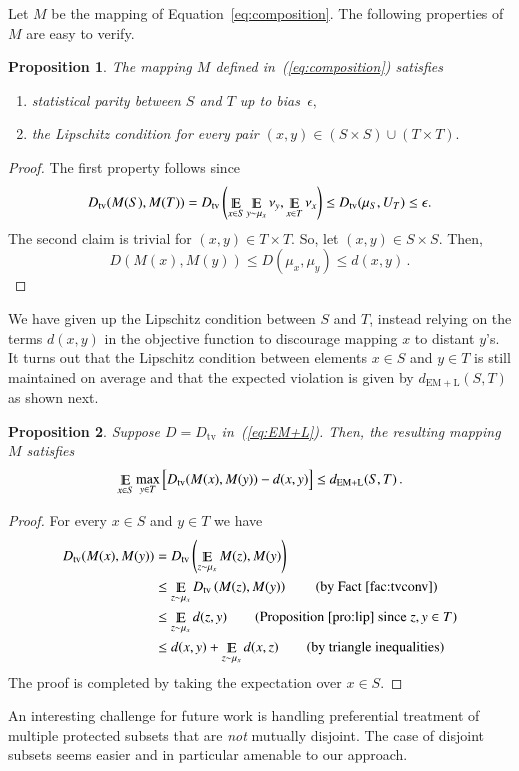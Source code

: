 \documentclass[letterpaper,11pt]{article}
\newtheorem{proposition}{Proposition}[section]
\theoremstyle{definition}
\renewcommand{\mathbb}{\varmathbb}
\newcommand{\Esymb}{\mathbb{E}}
\DeclareMathOperator*{\E}{\Esymb}
\newcommand{\mper}{\,.}
\newcommand{\tv}{\mathrm{tv}}
\newcommand\EM{\mathrm{EM}}
\begin{document}
\noindent
Let $M$ be the mapping of Equation~\ref{eq:composition}.  The
following properties of~$M$ are easy to verify.
\begin{proposition}\label{pro:lip}
The mapping $M$ defined in~(\ref{eq:composition})
satisfies
\begin{enumerate}
\item statistical parity between $S$ and $T$ up to bias~$\epsilon,$
\item the Lipschitz condition for every pair $(x,y)\in (S\times
S)\cup(T\times T).$
\end{enumerate}
\end{proposition}
\begin{proof}
The first property follows since
\[
D_\tv(M(S),M(T))=D_\tv\left(\E_{x\in S}\E_{y\sim\mu_x}\nu_y,\E_{x\in
T}\nu_x\right)
\le D_\tv(\mu_S,U_T)\le\epsilon.
\]
The second claim is trivial for $(x,y)\in T\times T.$ So, let $(x,y)\in S\times
S.$ Then,
\[
D(M(x),M(y))
\le D(\mu_x,\mu_y)
\le d(x,y)\mper
\]
\end{proof}

We have given up the Lipschitz condition between $S$ and $T$, instead
relying on the terms $d(x,y)$ in the objective function to
discourage mapping $x$ to distant $y$'s. It turns out that the Lipschitz
condition between elements $x\in S$ and $y\in T$ is still maintained on
average and that the expected violation is given by $d_{\EM+\mathrm{L}}(S,T)$
as shown next.
%
\begin{proposition}
Suppose $D=D_\tv$ in~(\ref{eq:EM+L}). Then, the resulting mapping $M$
satisfies
\[
\E_{x\in S}
\max_{y\in T}
\Big[
D_\tv(M(x),M(y))- d(x,y)
\Big]\le
d_{\EM+\mathrm{L}}(S,T)\mper
\]
\end{proposition}
\begin{proof}
For every $x\in S$ and $y\in T$ we have
\begin{align*}
D_\tv(M(x),M(y))
& = D_\tv\left(\E_{z\sim\mu_x}M(z),M(y)\right)\\
&\le \E_{z\sim\mu_x}D_\tv\left(M(z),M(y)\right)
\tag{by Fact~\ref{fac:tvconv}}\\
&\le \E_{z\sim\mu_x}d(z,y)
\tag{Proposition~\ref{pro:lip} since $z,y\in T$}\\
&\le d(x,y)+\E_{z\sim\mu_x} d(x,z) \tag{by triangle inequalities}
\end{align*}
The proof is completed by taking the expectation over $x\in S.$
\end{proof}

An interesting challenge for future work is handling preferential
treatment of multiple protected subsets that are {\it not} mutually
disjoint. The case of disjoint subsets seems easier and in particular
amenable to our approach.
\end{document}
